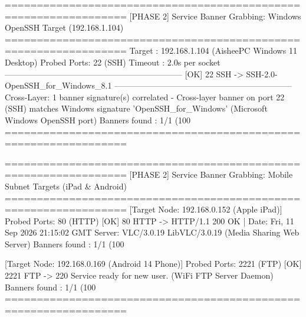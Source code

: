 \begin{logbox}
=================================================================
  [PHASE 2] Service Banner Grabbing: Windows OpenSSH Target (192.168.1.104)
=================================================================
  Target      : 192.168.1.104 (AisheePC Windows 11 Desktop)
  Probed Ports: 22 (SSH)
  Timeout     : 2.0s per socket
-----------------------------------------------------------------
  [OK]    22  SSH      -> SSH-2.0-OpenSSH_for_Windows_8.1
-----------------------------------------------------------------
  Cross-Layer: 1 banner signature(s) correlated
    - Cross-layer banner on port 22 (SSH) matches Windows signature 'OpenSSH_for_Windows' (Microsoft Windows OpenSSH port)
  Banners found : 1/1 (100%
=================================================================

=================================================================
  [PHASE 2] Service Banner Grabbing: Mobile Subnet Targets (iPad & Android)
=================================================================
  [Target Node: 192.168.0.152 (Apple iPad)]
  Probed Ports: 80 (HTTP)
  [OK]    80  HTTP     -> HTTP/1.1 200 OK | Date: Fri, 11 Sep 2026 21:15:02 GMT
                          Server: VLC/3.0.19 LibVLC/3.0.19 (Media Sharing Web Server)
  Banners found : 1/1 (100%

  [Target Node: 192.168.0.169 (Android 14 Phone)]
  Probed Ports: 2221 (FTP)
  [OK]  2221  FTP      -> 220 Service ready for new user. (WiFi FTP Server Daemon)
  Banners found : 1/1 (100%
=================================================================
\end{logbox}
